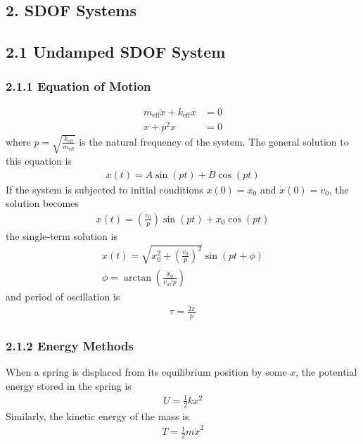 \begin{multicols*}{2}
\section*{2. SDOF Systems}
\subsection*{2.1 Undamped SDOF System}
\subsubsection*{2.1.1 Equation of Motion}
\begin{align*}
    m_{\text{eff}} \ddot{x} + k_{\text{eff}}x &= 0 \\
    \ddot{x} + p^2x &= 0
\end{align*}
where $p = \sqrt{\frac{k_{\text{eff}}}{m_{\text{eff}}}}$ is the natural frequency of the system. The general solution to this equation is
\begin{align*}
    x(t) = A\sin(pt) + B\cos(pt)
\end{align*}
If the system is subjected to initial conditions $x(0) = x_0$ and $\dot{x}(0) = v_0$, the solution becomes
\begin{align*}
    x(t) = \left(\frac{v_0}{p}\right)\sin(pt) + x_0\cos(pt)
\end{align*}
the single-term solution is
\begin{align*}
    x(t) = \sqrt{x_0^2 + \left(\frac{v_0}{p}\right)^2}\sin\left(pt + \phi\right) \\
    \phi = \arctan\left(\frac{x_0}{v_0/p}\right)
\end{align*}
and period of oscillation is
\begin{align*}
    \tau = \frac{2\pi}{p}
\end{align*}

\subsubsection{2.1.2 Energy Methods}
When a spring is displaced from its equilibrium position by some $x$, the potential energy stored in the spring is
\begin{align*}
    U = \frac{1}{2}kx^2
\end{align*}
Similarly, the kinetic energy of the mass is
\begin{align*}
    T = \frac{1}{2}m\dot{x}^2
\end{align*}


\end{multicols*}
